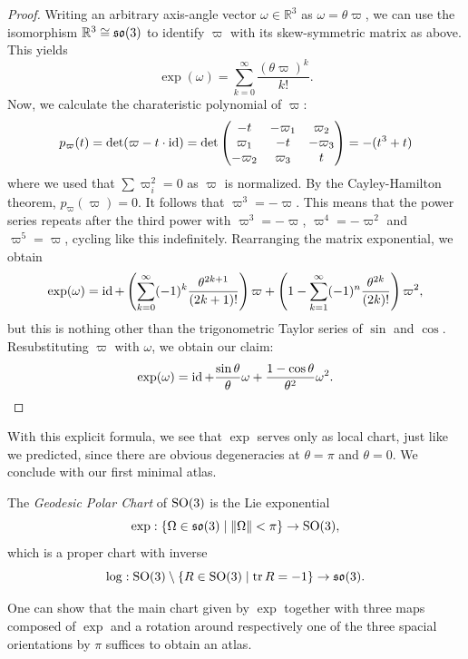 \begin{proof}
    Writing an arbitrary axis-angle vector $\omega \in \mathbb{R}^3$ as $\omega = \theta \varpi$, we can use the isomorphism $\mathbb{R}^3 \cong \operatorname{\mathfrak{s}\mathfrak{o}}(3)$ to identify $\varpi$ with its skew-symmetric matrix as above. This yields 
    \[
        \exp(\omega) = \sum_{k=0}^\infty \frac{(\theta \varpi)^k}{k!}
    .\] Now, we calculate the charateristic polynomial of $\varpi$:
    \[
    p_\varpi(t)=\det(\varpi - t \cdot \operatorname{id})= \det \begin{pmatrix} -t & - \varpi_1 & \varpi_2\\ \varpi_1 & -t & -\varpi_3\\ - \varpi_2 & \varpi_3 & t \end{pmatrix} = -(t^3+t)
    \] where we used that $\sum \varpi_i^2 = 0$ as $\varpi$ is normalized. By the Cayley-Hamilton theorem, $p_\varpi(\varpi) = 0$. It follows that $\varpi^3 = - \varpi$. This means that the power series repeats after the third power with $\varpi^3 = - \varpi$, $\varpi^4 = - \varpi^2$ and $\varpi^5 = \varpi$, cycling like this indefinitely. Rearranging the matrix exponential, we obtain
    \[
        \exp(\omega) = \operatorname{id} + \left( \sum_{k=0}^\infty (-1)^k \frac{\theta^{2k+1}}{(2k+1)!}  \right) \varpi + \left( 1 - \sum_{k=1}^\infty (-1)^n \frac{\theta^{2k}}{(2k)!} \right) \varpi^2 
    ,\] but this is nothing other than the trigonometric Taylor series of $\sin$ and $\cos$. Resubstituting $\varpi$ with $\omega$, we obtain our claim:
    \[
    \exp(\omega)=\operatorname{id}+\frac{\sin \theta}{\theta} \omega + \frac{1- \cos \theta}{\theta^2} \omega^2
    .\] 
\end{proof}
With this explicit formula, we see that $\exp$ serves only as local chart, just like we predicted, since there are obvious degeneracies at $\theta = \pi$ and $\theta=0$. We conclude with our first minimal atlas.
\begin{theorem}
    The \emph{Geodesic Polar Chart} of $\operatorname{SO}(3)$ is the Lie exponential
    \[
        \exp: \{\Omega \in \operatorname{\mathfrak{s}\mathfrak{o}}(3) \mid \| \Omega \| < \pi \} \to \operatorname{SO}(3) 
    ,\] which is a proper chart with inverse
    \[
        \log: \operatorname{SO}(3) \setminus \{ R \in \operatorname{SO}(3) \mid \operatorname{tr} R = -1\} \to \operatorname{\mathfrak{s}\mathfrak{o}}(3)
    .\]
\end{theorem}
One can show that the main chart given by $\exp$ together with three maps composed of $\exp$ and a rotation around respectively one of the three spacial orientations by $\pi$ suffices to obtain an atlas.
